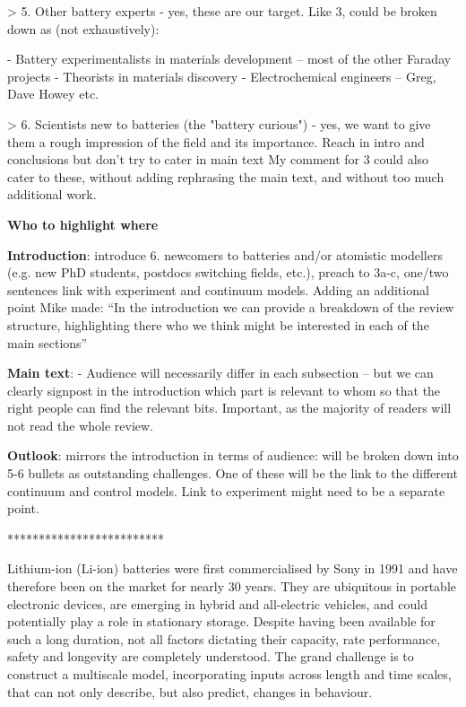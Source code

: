 \documentclass[../main.tex]{subfiles}
\begin{document}
> 5. Other battery experts - yes, these are our target. Like 3, could be broken down as (not exhaustively):

- Battery experimentalists in materials development – most of the other Faraday projects
- Theorists in materials discovery
- Electrochemical engineers – Greg, Dave Howey etc.

> 6. Scientists new to batteries (the "battery curious") - yes, we want to give them a rough impression of the field and its importance. Reach in intro and conclusions but don’t try to cater in main text
My comment for 3 could also cater to these, without adding rephrasing the main text, and without too much additional work.

\textbf{Who to highlight where}

\textbf{Introduction}: 
introduce 6. newcomers to batteries and/or atomistic modellers (e.g. new PhD students, postdocs switching fields, etc.), preach to 3a-c, one/two sentences link with experiment and continuum models.
Adding an additional point Mike made: “In the introduction we can provide a breakdown of the review structure, highlighting there who we think might be interested in each of the main sections”


\textbf{Main text}: 
- Audience will necessarily differ in each subsection – but we can clearly signpost in the introduction which part is relevant to whom so that the right people can find the relevant bits.
Important, as the majority of readers will not read the whole review.

\textbf{Outlook}: 
mirrors the introduction in terms of audience: will be broken down into 5-6 bullets as outstanding challenges.
One of these will be the link to the different continuum and control models. Link to experiment might need to be a separate point.


*************************



  Lithium-ion (Li-ion) batteries were first commercialised by Sony in 1991 and have therefore been on the market for nearly 30 years. They are ubiquitous in portable electronic devices, are emerging in hybrid and all-electric vehicles, and could potentially play a role in stationary storage. Despite having been available for such a long duration, not all factors dictating their capacity, rate performance, safety and longevity are completely understood. The grand challenge is to construct a multiscale model, incorporating inputs across length and time scales, that can not only describe, but also predict, changes in behaviour.
  
\end{document}
